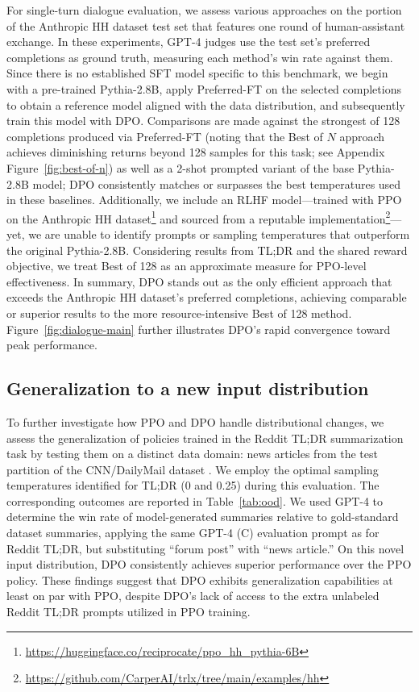 For single-turn dialogue evaluation, we assess various approaches on the portion of the Anthropic HH dataset \citep{bai2022training} test set that features one round of human-assistant exchange. In these experiments, GPT-4 judges use the test set's preferred completions as ground truth, measuring each method's win rate against them. Since there is no established SFT model specific to this benchmark, we begin with a pre-trained Pythia-2.8B, apply Preferred-FT on the selected completions to obtain a reference model aligned with the data distribution, and subsequently train this model with DPO. Comparisons are made against the strongest of 128 completions produced via Preferred-FT (noting that the Best of $N$ approach achieves diminishing returns beyond 128 samples for this task; see Appendix Figure~\ref{fig:best-of-n}) as well as a 2-shot prompted variant of the base Pythia-2.8B model; DPO consistently matches or surpasses the best temperatures used in these baselines. Additionally, we include an RLHF model—trained with PPO on the Anthropic HH dataset\footnote{\url{https://huggingface.co/reciprocate/ppo_hh_pythia-6B}} and sourced from a reputable implementation\footnote{\url{https://github.com/CarperAI/trlx/tree/main/examples/hh}}—yet, we are unable to identify prompts or sampling temperatures that outperform the original Pythia-2.8B. Considering results from TL;DR and the shared reward objective, we treat Best of 128 as an approximate measure for PPO-level effectiveness. In summary, DPO stands out as the only efficient approach that exceeds the Anthropic HH dataset's preferred completions, achieving comparable or superior results to the more resource-intensive Best of 128 method. Figure~\ref{fig:dialogue-main} further illustrates DPO’s rapid convergence toward peak performance.

\subsection{Generalization to a new input distribution}

To further investigate how PPO and DPO handle distributional changes, we assess the generalization of policies trained in the Reddit TL;DR summarization task by testing them on a distinct data domain: news articles from the test partition of the CNN/DailyMail dataset \citep{nallapati-etal-2016-abstractive}. We employ the optimal sampling temperatures identified for TL;DR (0 and 0.25) during this evaluation. The corresponding outcomes are reported in Table~\ref{tab:ood}. We used GPT-4 to determine the win rate of model-generated summaries relative to gold-standard dataset summaries, applying the same GPT-4 (C) evaluation prompt as for Reddit TL;DR, but substituting “forum post” with “news article.” On this novel input distribution, DPO consistently achieves superior performance over the PPO policy. These findings suggest that DPO exhibits generalization capabilities at least on par with PPO, despite DPO’s lack of access to the extra unlabeled Reddit TL;DR prompts utilized in PPO training.


